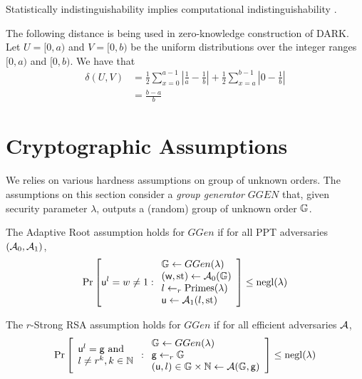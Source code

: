 \begin{lemma}
\textup{Statistically indistinguishability} implies \textup{computational indistinguishability} \cite{goldreich2007foundations}.
\end{lemma}

The following distance is being used in zero-knowledge construction of DARK.\\
Let $U = [0, a)$ and $V = [0, b)$ be the uniform distributions over the integer ranges $[0, a)$ and $[0, b)$. We have that
\begin{align*}
\delta(U, V) &= \frac{1}{2} \sum_{x=0}^{a-1} \left\vert\frac{1}{a} - \frac{1}{b}\right\vert + \frac{1}{2}\sum_{x=a}^{b-1} \left\vert0 - \frac{1}{b}\right\vert \\ 
& = \frac{b-a}{b}
\end{align*}

\section{Cryptographic Assumptions}

We relies on various hardness assumptions on group of unknown orders.
The assumptions on this section consider a \textit{group generator} $GGEN$ that, given security parameter $\lambda$, outputs a (random) group of unknown order $\mathbb{G}$.

\begin{assumption}
\label{adaptive-root}
The Adaptive Root assumption holds for $GGen$ if for all PPT adversaries $(\mathcal{A}_0, \mathcal{A}_1)$,
\begin{align*}
\mathrm{Pr} \left[ \mathsf{u}^l = w \ne 1 : \begin{array}{l}
\mathbb{G} \gets GGen(\lambda) \\
(\mathsf{w}, \mathrm{st}) \gets \mathcal{A}_0(\mathbb{G}) \\
l \gets_r \mathrm{Primes}(\lambda) \\
\mathsf{u} \gets \mathcal{A}_1(l, \mathrm{st})
\end{array} \right] \le \mathrm{negl}(\lambda)
\end{align*}
\end{assumption}

\begin{assumption}
\label{r-strong-rsa}
The $r$-Strong RSA assumption holds for $GGen$ if for all efficient adversaries $\mathcal{A}$,
\begin{align*}
\mathrm{Pr} \left[ 
\begin{array}{l}
\mathsf{u}^l = \mathsf{g} \text{ \textup{and}} \\
l \ne r^k, k \in \mathbb{N}
\end{array}
:
\begin{array}{l}
\mathbb{G} \gets GGen(\lambda) \\
\mathsf{g} \gets_r \mathbb{G} \\
(\mathsf{u}, l) \in \mathbb{G} \times \mathbb{N} \gets \mathcal{A}(\mathbb{G}, \mathsf{g})
\end{array}
 \right] \le \mathrm{negl}(\lambda)
\end{align*}
\end{assumption}

